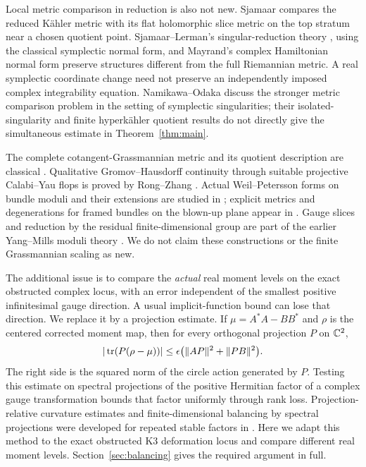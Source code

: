 Local metric comparison in reduction is also not new. Sjamaar
\cite[arXiv version, Lemma~2.13 and its proof]{Sja95} compares the reduced
K\"ahler metric with its flat holomorphic slice metric on the top stratum
near a chosen quotient point. Sjamaar--Lerman's singular-reduction theory
\cite{SL91}, using the classical symplectic normal form, and Mayrand's
complex Hamiltonian normal form \cite[Theorems~1.3 and~1.4]{May22}
preserve structures different from the full Riemannian metric. A real symplectic
coordinate change need not preserve an independently imposed complex
integrability equation. Namikawa--Odaka \cite[Remark~6.14]{NO26}
discuss the stronger metric comparison problem in the setting of
symplectic singularities; their isolated-singularity and finite
hyperk\"ahler quotient results do not directly give the simultaneous
estimate in Theorem~\ref{thm:main}.

The complete cotangent-Grassmannian metric and its quotient description
are classical \cite{BG96}. Qualitative Gromov--Hausdorff continuity
through suitable projective Calabi--Yau flops is proved by Rong--Zhang
\cite[Theorem~1.2]{RZ11}. Actual Weil--Petersson forms on bundle moduli
and their extensions are studied in \cite{BS21,BS23}; explicit metrics
and degenerations for framed bundles on the blown-up plane appear in
\cite{BS26}. Gauge slices and reduction by the residual finite-dimensional
group are part of the earlier Yang--Mills moduli theory
\cite{GP89}. We do not claim these constructions or the finite
Grassmannian scaling as new.

The additional issue is to compare the \emph{actual} real moment levels
on the exact obstructed complex locus, with an error independent of the
smallest positive infinitesimal gauge direction. A usual implicit-function
bound can lose that direction. We replace it by a projection estimate.
If $\mu=A^*A-BB^*$ and $\rho$ is the centered corrected moment map,
then for every orthogonal projection $P$ on $\mathbb C^2$,
\[
|\operatorname{tr}(P(\rho-\mu))|
\le\epsilon\bigl(\|AP\|^2+\|PB\|^2\bigr).
\]
The right side is the squared norm of the circle action generated by
$P$. Testing this estimate on spectral projections of the positive
Hermitian factor of a complex gauge transformation bounds that factor
uniformly through rank loss. Projection-relative curvature estimates and
finite-dimensional balancing by spectral projections were developed for
repeated stable factors in \cite{Wue26a,Wue26c}. Here we adapt this method
to the exact obstructed K3 deformation locus and compare different real
moment levels. Section~\ref{sec:balancing} gives the required argument
in full.

